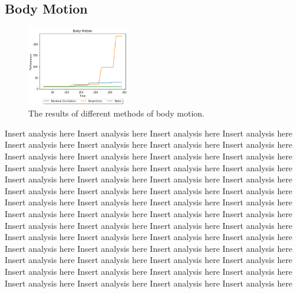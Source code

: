 \documentclass{article}
\begin{document}
\subsection{Body Motion}
\begin{figure}
    \centering
    \vspace*{-5mm}
    \includegraphics[width=0.4\textwidth]{bodyResults}
    \vspace*{-7mm}
    \caption{The results of different methods of body motion.}
\end{figure}
Insert analysis here Insert analysis here Insert analysis here Insert analysis here Insert analysis here Insert analysis here Insert analysis here Insert analysis here Insert analysis here Insert analysis here Insert analysis here Insert analysis here Insert analysis here Insert analysis here Insert analysis here Insert analysis here Insert analysis here Insert analysis here Insert analysis here Insert analysis here Insert analysis here Insert analysis here Insert analysis here Insert analysis here Insert analysis here Insert analysis here Insert analysis here Insert analysis here Insert analysis here Insert analysis here Insert analysis here Insert analysis here Insert analysis here Insert analysis here Insert analysis here Insert analysis here Insert analysis here Insert analysis here Insert analysis here Insert analysis here Insert analysis here Insert analysis here Insert analysis here Insert analysis here Insert analysis here Insert analysis here Insert analysis here Insert analysis here Insert analysis here Insert analysis here Insert analysis here Insert analysis here Insert analysis here Insert analysis here Insert analysis here Insert analysis here

\end{document}
